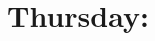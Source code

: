 \documentclass[,%
	draft=false,%
	numbers=noendperiod
	12pt,
	a4paper,
	oneside,%
	openany,
]{memoir}
\begin{document}
\begin{comment}
		Supp s.c.\ $\Psi$-term $t\occ{v}$ s.t. $v\sigma_i$ contains grey $u$\todo{basically also grey occ of $v$ with $t\occ{u}$ conceivable, but that should be IH}.
		By IH, $v$ does not occur grey in a a $\Phi$-literal (given it does not occur grey in a grey literal). 

		By IH, there is no s.c.{} $\Psi$-term which contains $u$.
		Hence $t\occ{v}$ is not directly unified with some $t\occ{u}$.

		Supp $v$ occs grey where it is unified. then $u$ occs grey there as well.
		Then it can't be a grey literal, and it can't be a $\Phi$-literal. So it is a $\Psi$-literal.

	\end{proof}

	~

	\begin{clemma}
		If a var occurs in $\Gamma$ but not grey in a grey literal, it does not occur grey in $\Delta$.
	\end{clemma}

\end{comment}


\section{Thursday:}
\end{document}
